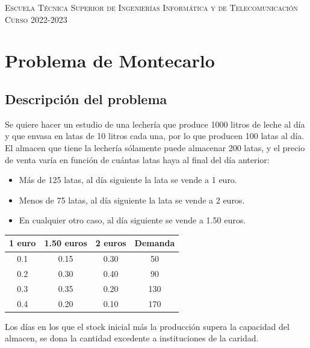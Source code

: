 \documentclass[11pt,a4paper]{report}
\begin{document}
\begin{titlepage}
\begin{minipage}{\textwidth}
\vspace{0.7cm}
\textsc{Escuela Técnica Superior de Ingenierías Informática y de Telecomunicación}\\
\vspace{1cm}
\textsc{Curso 2022-2023}
\end{minipage}
\end{titlepage}

\tableofcontents
\thispagestyle{empty}				%

\newpage

\setlength{\parskip}{1em}

\chapter{Problema de Montecarlo}
\newpage

\section{Descripción del problema}

Se quiere hacer un estudio de una lechería que produce 1000 litros de leche al día y que envasa en latas de 10 litros cada una, por lo que producen 100 latas al día. El almacen que tiene la lechería sólamente puede almacenar 200 latas, y el precio de venta varía en función de cuántas latas haya al final del día anterior:

\begin{itemize}
	\item{Más de 125 latas, al día siguiente la lata se vende a 1 euro.}
	\item{Menos de 75 latas, al día siguiente la lata se vende a 2 euros.}
	\item{En cualquier otro caso, al día siguiente se vende a 1.50 euros.}
\end{itemize}

\begin{tabular}{cccc}
	\hline
	1 euro & 1.50 euros & 2 euros & Demanda\\
	\hline
	0.1 & 0.15 & 0.30 & 50\\
	0.2 & 0.30 & 0.40 & 90\\
	0.3 & 0.35 & 0.20 & 130\\
	0.4 & 0.20 & 0.10 & 170\\
	\hline
\end{tabular}

Los días en los que el stock inicial más la producción supera la capacidad del almacen, se dona la cantidad excedente a instituciones de la caridad.
\end{document}
